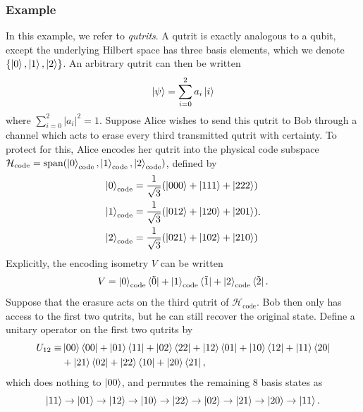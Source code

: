 \documentclass[12pt,a4paper]{report}
\numberwithin{equation}{section}
\newcommand{\ketbra}[2]{\ket{#1}\bra{#2}}
\newcommand{\ketbras}[1]{\ketbra{#1}{#1}}
\newcommand{\Hcode}{\mathcal{H}_{\text{code}}}
\theoremstyle{definition}
\theoremstyle{theorem}
\theoremstyle{theorem}
\theoremstyle{example}
\theoremstyle{definition}
\begin{document}
\subsubsection{Example}
In this example, we refer to \textit{qutrits}. A qutrit is exactly analogous to a qubit, except the underlying Hilbert space has three basis elements, which we denote $\{\ket{0},\ket{1},\ket{2}\}$. An arbitrary qutrit can then be written
\begin{equation}
	\ket{\psi}=\sum_{i=0}^{2}a_{i}\ket{i}
\end{equation}
where $\sum_{i=0}^{2}|a_{i}|^{2}=1$. Suppose Alice wishes to send this qutrit to Bob through a channel which acts to erase every third transmitted qutrit with certainty. To protect for this, Alice encodes her qutrit into the physical code subspace $\Hcode=\text{span}(\ket{0}_{\text{code}},\ket{1}_{\text{code}},\ket{2}_{\text{code}})$, defined by
\begin{equation}
	\begin{aligned}
		\ket{0}_{\text{code}}&=\frac{1}{\sqrt{3}}(\ket{{000}}+\ket{{111}}+\ket{{222}})\\
		\ket{1}_{\text{code}}&=\frac{1}{\sqrt{3}}(\ket{{012}}+\ket{{120}}+\ket{{201}})\\
		\ket{2}_{\text{code}}&=\frac{1}{\sqrt{3}}(\ket{{021}}+\ket{{102}}+\ket{{210}})
	\end{aligned}.
\end{equation}
Explicitly, the encoding isometry $V$ can be written
\begin{equation}
	V=\ket{0}_{\text{code}}\bra{\tilde{0}}+\ket{1}_{\text{code}}\bra{\tilde{1}}+\ket{2}_{\text{code}}\bra{\tilde{2}}.
\end{equation}
Suppose that the erasure acts on the third qutrit of $\Hcode$. Bob then only has access to the first two qutrits, but he can still recover the original state. Define a unitary operator on the first two qutrits by
\begin{equation}\label{unitary}
	\begin{aligned}
		U_{12}\equiv&\ketbras{{00}}+\ketbra{{01}}{{11}}+\ketbra{{02}}{{22}}+\ketbra{{12}}{{01}}+\ketbra{{10}}{{12}}+\ketbra{{11}}{{20}}\\&+\ketbra{{21}}{{02}}+\ketbra{{22}}{{10}}+\ketbra{{20}}{{21}},
	\end{aligned}
\end{equation}
which does nothing to $\ket{{00}}$, and permutes the remaining 8 basis states as
\begin{equation}
	\ket{{11}}\to\ket{{01}}\to\ket{{12}}\to\ket{{10}}\to\ket{{22}}\to\ket{{02}}\to\ket{{21}}\to\ket{{20}}\to\ket{{11}}.
\end{equation}
\end{document}
